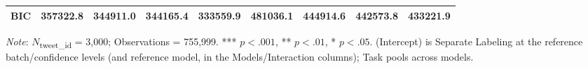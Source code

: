 \documentclass{article}
\begin{document}
\begin{table}
{\begin{tabular}{lcccccccc}
BIC & 357322.8 & 344911.0 & 344165.4 & 333559.9 & 481036.1 & 444914.6 & 442573.8 & 433221.9 \\
\bottomrule
\end{tabular}%
}
\smallskip
\begin{minipage}{\textwidth}
\raggedright
\footnotesize \textit{Note}: $N$\textsubscript{tweet\_id} = 3,000; Observations = 755,999. *** $p<.001$, ** $p<.01$, * $p<.05$. (Intercept) is Separate Labeling at the reference batch/confidence levels (and reference model, in the Models/Interaction columns); Task pools across models.
\end{minipage}
\end{table}
\end{document}
